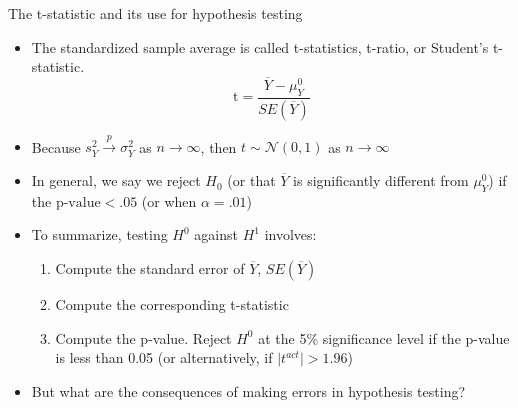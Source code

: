 \documentclass[notes,10pt, aspectratio=169]{beamer}
\begin{document}
\begin{frame}{The t-statistic and its use for hypothesis testing}
\begin{itemize}
    \item The standardized sample average is called t-statistics, t-ratio, or Student's t-statistic.
    \begin{equation*}
        \text{t} = \frac{\overline{Y}-\mu_Y^0}{SE(\overline{Y})}
    \end{equation*}
    \item Because $s_Y^2 \xrightarrow{\mathit{p}}\sigma^2_Y$ as $n\rightarrow\infty$, then  $t\sim\mathcal{N}(0,1)$ as $n\rightarrow\infty$
    \item In general, we say we reject $H_0$ (or that $\overline{Y}$ is significantly different from $\mu_Y^0$) if the $\text{p-value}<.05$ (or when $\alpha=.01$)
    \item To summarize, testing $H^0$ against $H^1$ involves:
    \begin{enumerate}
        \item Compute the standard error of $\overline{Y}$, $SE(\overline{Y})$
        \item Compute the corresponding t-statistic
        \item Compute the p-value. Reject $H^0$ at the 5\% significance level if the p-value is less than 0.05 (or alternatively, if $\mid t^{act} \mid > 1.96$)
    \end{enumerate}
    \item But what are the consequences of making errors in hypothesis testing?
\end{itemize}
\end{frame}
\end{document}
